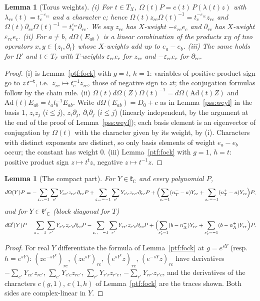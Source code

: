\documentclass[10pt]{amsart}
\newtheorem{lemma}[theorem]{Lemma}
\theoremstyle{definition}
\theoremstyle{remark}
\newcommand{\C}{\mathbb C}
\begin{document}
\begin{lemma}[Torus weights]\label{pss:torus}
\textup{(i)} For $t\in T_X$, $\Omega(t)P=c(t)\,P(\lambda(t)z)$ with $\lambda_{rc}(t)=t_c^{-\varepsilon_{rc}}$ and a
character $c$; hence $\Omega(t)z_{rc}\Omega(t)^{-1}=t_c^{-\varepsilon_{rc}}z_{rc}$ and
$\Omega(t)\partial_{rc}\Omega(t)^{-1}=t_c^{\varepsilon_{rc}}\partial_{rc}$. We say $z_{rc}$ has \emph{$X$-weight}
$-\varepsilon_{rc}e_c$ and $\partial_{rc}$ has $X$-weight $\varepsilon_{rc}e_c$.
\textup{(ii)} For $a\ne b$, $d\Omega(E_{ab})$ is a linear combination of the products $xy$ of two
operators $x,y\in\{z_i,\partial_i\}$ whose $X$-weights add up to $e_a-e_b$.
\textup{(iii)} The same holds for $\Omega'$ and $t\in T_T$ with \emph{$T$-weights} $\varepsilon_{rc}e_r$ for
$z_{rc}$ and $-\varepsilon_{rc}e_r$ for $\partial_{rc}$.
\end{lemma}
\begin{proof}
(i) is Lemma~\ref{ptf:fock} with $g=t$, $h=1$: variables of positive product sign go to $z\,t^{-\mathsf t}$, i.e.\
$z_{rc}\mapsto t_c^{-1}z_{rc}$, those of negative sign to $zt$; the conjugation formulas follow by the
chain rule. (ii) $\Omega(t)d\Omega(Z)\Omega(t)^{-1}=d\Omega(\mathrm{Ad}(t)Z)$ and $\mathrm{Ad}(t)E_{ab}=t_at_b^{-1}E_{ab}$.
Write $d\Omega(E_{ab})=D_0+c$ as in Lemma~\ref{pss:weyl} in the basis $1$, $z_iz_j$ ($i\le j$), $z_i\partial_j$,
$\partial_i\partial_j$ ($i\le j$) (linearly independent, by the argument at the end of the proof of
Lemma~\ref{pss:weyl}); each basis element is an eigenvector of conjugation by $\Omega(t)$ with the
character given by its weight, by (i). Characters with distinct exponents are distinct, so only basis
elements of weight $e_a-e_b$ occur; the constant has weight $0$. (iii) Lemma~\ref{ptf:fock} with $g=1$,
$h=t$: positive product sign $z\mapsto t^{\mathsf t}z$, negative $z\mapsto t^{-1}z$.
\end{proof}

\begin{lemma}[The compact part]\label{pss:cpt}
For $Y\in\mathfrak k_\C$ and every polynomial $P$,
\[
d\Omega(Y)P=-\sum_{\varepsilon_{rc}=1}\sum_{c'}Y_{cc'}z_{rc'}\partial_{rc}P+\sum_{\varepsilon_{rc}=-1}\sum_{c'}
Y_{c'c}z_{rc'}\partial_{rc}P+\Bigl(\sum_{s_c=1}(n_T^--a)Y_{cc}+\sum_{s_c=-1}(n_T^+-a)Y_{cc}\Bigr)P,
\]
and for $Y\in\mathfrak k'_\C$ (block diagonal for $T$)
\[
d\Omega'(Y)P=\sum_{\varepsilon_{rc}=1}\sum_{r'}Y_{r'r}z_{r'c}\partial_{rc}P-\sum_{\varepsilon_{rc}=-1}\sum_{r'}
Y_{rr'}z_{r'c}\partial_{rc}P+\Bigl(\sum_{s'_r=1}(b-n_X^-)Y_{rr}+\sum_{s'_r=-1}(b-n_X^+)Y_{rr}\Bigr)P .
\]
\end{lemma}
\begin{proof}
For real $Y$ differentiate the formula of Lemma~\ref{ptf:fock} at $g=e^{sY}$ (resp.\ $h=e^{sY}$):
$(z e^{-sY^{\mathsf t}})_{rc}$, $(ze^{sY})_{rc}$, $(e^{sY^{\mathsf t}}z)_{rc}$, $(e^{-sY}z)_{rc}$ have derivatives
$-\sum_{c'}Y_{cc'}z_{rc'}$, $\sum_{c'}Y_{c'c}z_{rc'}$, $\sum_{r'}Y_{r'r}z_{r'c}$, $-\sum_{r'}Y_{rr'}z_{r'c}$, and the
derivatives of the characters $c(g,1)$, $c(1,h)$ of Lemma~\ref{ptf:fock} are the traces shown. Both sides
are complex-linear in $Y$.
\end{proof}
\end{document}
